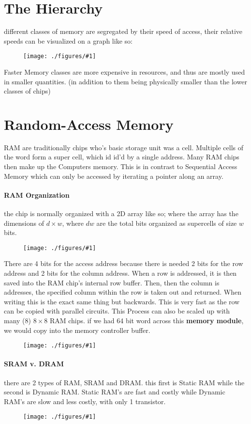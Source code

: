 \documentclass[12pt]{book}
\title{\coursetitle\linebreak\lecturename}
\author{\\Cain Susko\\ 
           \\ \\ \\
      Queen's University 
    \\School of Computing\\}
\newcommand{\incimg}[2]{%
       \begin{figure}[h]
               \centering
               \texttt{[image: ./figures/\#1]}
       \end{figure}
}
\begin{document}
\begin{titlepage}
        \maketitle
\end{titlepage}


\section*{The Hierarchy}
different classes of memory are segregated by their speed of access,
their relative speeds can be visualized on a graph like so:
\incimg{memTri}{0.7}

Faster Memory classes are more expensive in resources, and thus are mostly
used in smaller quantities. (in addition to them being physically smaller
than the lower classes of chips)

\section*{Random-Access Memory}
RAM are traditionally chips who's basic storage unit was a cell. Multiple cells
of the word form a super cell, which id id'd by a single address. Many
RAM chips then make up the Computers memory. This is in contrast to Sequential 
Access Memory which can only be accessed by iterating a 
pointer along an array.
\pagebreak

\paragraph{RAM Organization}
the chip is normally organized with a 2D array like so; where the array 
has the dimensions of $d \times w$, where $dw$ are the total bits organized as
supercells of size $w$ bits.
\incimg{RAM}{0.7}

There are 4 bits for the access address because there is needed 2 bits for the 
row address and 2 bits for the column address. When a row is addressed, it is 
then saved into the RAM chip's internal row buffer. Then, then the column is 
addresses, the specified column within the row is taken out and returned. When 
writing this is the exact same thing but backwards. This is very fast as the
row can be copied with parallel circuits. This Process can also be scaled up 
with many (8) $8 \times 8$ RAM chips. if we had 64 bit word across this \textbf{
memory module}, we would copy into the memory controller buffer.
\incimg{memMod}{0.5}

\paragraph{SRAM v. DRAM}
there are 2 types of RAM, SRAM and DRAM. this first is Static RAM while the 
second is Dynamic RAM. Static RAM's are fast and costly while Dynamic RAM's
are slow and less costly, with only 1 transistor.
\incimg{ramvram}{0.5}
\end{document}
